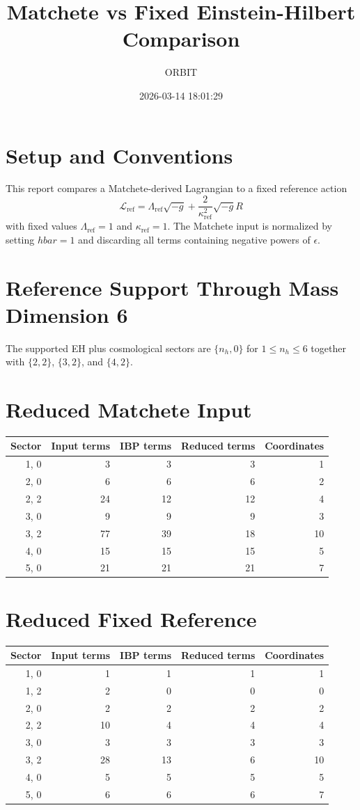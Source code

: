 \documentclass[11pt]{article}
\title{Matchete vs Fixed Einstein-Hilbert Comparison}
\author{ORBIT}
\date{2026-03-14 18:01:29}
\begin{document}
\maketitle
\tableofcontents
\section{Setup and Conventions}
This report compares a Matchete-derived Lagrangian to a fixed reference action
\begin{equation}
\mathcal{L}_{\mathrm{ref}} = \Lambda_{\mathrm{ref}} \sqrt{-g} + \frac{2}{\kappa_{\mathrm{ref}}^2} \sqrt{-g} R
\end{equation}
with fixed values $\Lambda_{\mathrm{ref}} = 1$ and $\kappa_{\mathrm{ref}} = 1$.
The Matchete input is normalized by setting $hbar = 1$ and discarding all terms containing negative powers of $\epsilon$.
\section{Reference Support Through Mass Dimension 6}
The supported EH plus cosmological sectors are $\{n_h, 0\}$ for $1 \le n_h \le 6$ together with $\{2,2\}$, $\{3,2\}$, and $\{4,2\}$.
\section{Reduced Matchete Input}
\begin{longtable}{rrrrr}
\toprule
Sector & Input terms & IBP terms & Reduced terms & Coordinates \\
\midrule
{1, 0} & 3 & 3 & 3 & 1 \\
{2, 0} & 6 & 6 & 6 & 2 \\
{2, 2} & 24 & 12 & 12 & 4 \\
{3, 0} & 9 & 9 & 9 & 3 \\
{3, 2} & 77 & 39 & 18 & 10 \\
{4, 0} & 15 & 15 & 15 & 5 \\
{5, 0} & 21 & 21 & 21 & 7 \\
\bottomrule
\end{longtable}
\section{Reduced Fixed Reference}
\begin{longtable}{rrrrr}
\toprule
Sector & Input terms & IBP terms & Reduced terms & Coordinates \\
\midrule
{1, 0} & 1 & 1 & 1 & 1 \\
{1, 2} & 2 & 0 & 0 & 0 \\
{2, 0} & 2 & 2 & 2 & 2 \\
{2, 2} & 10 & 4 & 4 & 4 \\
{3, 0} & 3 & 3 & 3 & 3 \\
{3, 2} & 28 & 13 & 6 & 10 \\
{4, 0} & 5 & 5 & 5 & 5 \\
{5, 0} & 6 & 6 & 6 & 7 \\
\bottomrule
\end{longtable}
\end{document}
